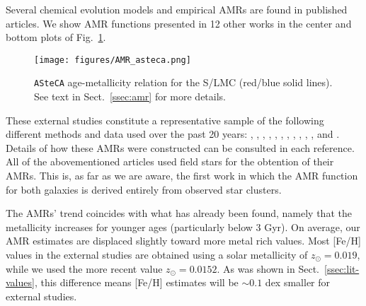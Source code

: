 \documentclass[draft]{aa}
\renewcommand{\includegraphics}[2][]{}
\begin{document}
Several chemical evolution models and empirical AMRs are found in published
articles.
We show AMR functions presented in 12 other works in the center and bottom plots
of Fig.~\ref{fig:amr}.
%
\begin{figure}
\centering
\texttt{[image: figures/AMR\_asteca.png]}
\caption{\texttt{ASteCA} age-metallicity relation for the S/LMC (red/blue
solid lines). See text in Sect.~\ref{ssec:amr} for more details.}
\label{fig:amr}
\end{figure}
%
These external studies constitute a representative sample of the following
different methods and data used over the past 20 years:
\citet[][PT98; bursting models]{Pagel_1998}, \citet[][G98; closed-box model
with Holtzman SFH]{Geha_1998}, \citet[][HZ04]{Harris_2004}, \citet[][C08a;
average of four disk frames]{Carrera_2008_lmc}, \citet[][C08b; average of
13 frames]{Carrera_2008_smc}, \citet[][HZ09]{Harris_2009}, \citet[][N09;
5th degree polynomial fit to the AMRs of their three observed regions]
{Noel_2009}, \citet[][TB09; 1: no merger model, 2: equal mass merger, 3: one
to four merger]{Tsujimoto_2009}, \citet[][R12; four tiles average]{Rubele_2012},
\citet[][C13; B: Bologna, C: Cole]{Cignoni_2013}, \citet[][PG13]
{Piatti_Geisler_2013}, and \citet[][M14; 0: field LMC0, 1: field LMC1, 2: field
LMC2]{Meschin_2014}.
Details of how these AMRs were constructed can be consulted in each reference.
%
All of the abovementioned articles used field stars for the obtention
of their AMRs. This is, as far as we are aware, the first work in which the AMR
function for both galaxies is derived entirely from observed star clusters.


The AMRs' trend coincides with what has already been found, namely that the
metallicity increases for younger ages (particularly below 3 Gyr). On average,
our AMR estimates are displaced slightly toward more metal rich values.
Most [Fe/H] values in the external studies are obtained using a solar
metallicity of $z_{\odot}{=}0.019$, while we used the more recent value
$z_{\odot}{=}0.0152$. As was shown in Sect.~\ref{ssec:lit-values}, this
difference means [Fe/H] estimates will be ${\sim}0.1$ dex smaller for external
studies.
\end{document}
